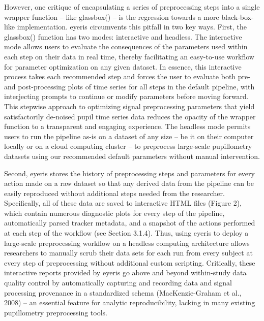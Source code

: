 However, one critique of encapsulating a series of preprocessing steps into a single wrapper function – like glassbox() – is the regression towards a more black-box-like implementation. eyeris circumvents this pitfall in two key ways. First, the glassbox() function has two modes: interactive and headless. The interactive mode allows users to evaluate the consequences of the parameters used within each step on their data in real time, thereby facilitating an easy-to-use workflow for parameter optimization on any given dataset. In essence, this interactive process takes each recommended step and forces the user to evaluate both pre- and post-processing plots of time series for all steps in the default pipeline, with interjecting prompts to continue or modify parameters before moving forward. This stepwise approach to optimizing signal preprocessing parameters that yield satisfactorily de-noised pupil time series data reduces the opacity of the wrapper function to a transparent and engaging experience. The headless mode permits users to run the pipeline as-is on a dataset of any size – be it on their computer locally or on a cloud computing cluster – to preprocess large-scale pupillometry datasets using our recommended default parameters without manual intervention.

Second, eyeris stores the history of preprocessing steps and parameters for every action made on a raw dataset so that any derived data from the pipeline can be easily reproduced without additional steps needed from the researcher. Specifically, all of these data are saved to interactive HTML files (Figure 2), which contain numerous diagnostic plots for every step of the pipeline, automatically parsed tracker metadata, and a snapshot of the actions performed at each step of the workflow (see Section 3.1.4). Thus, using eyeris to deploy a large-scale preprocessing workflow on a headless computing architecture allows researchers to manually scrub their data sets for each run from every subject at every step of preprocessing without additional custom scripting. Critically, these interactive reports provided by eyeris go above and beyond within-study data quality control by automatically capturing and recording data and signal processing provenance in a standardized schema (MacKenzie-Graham et al., 2008) – an essential feature for analytic reproducibility, lacking in many existing pupillometry preprocessing tools.

